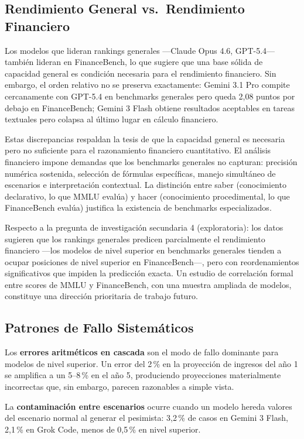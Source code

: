 \documentclass[12pt,a4paper]{article}
\begin{document}
\subsection{Rendimiento General vs.\ Rendimiento Financiero}

Los modelos que lideran rankings generales ---Claude Opus 4.6, GPT-5.4--- también lideran en FinanceBench, lo que sugiere que una base sólida de capacidad general es condición necesaria para el rendimiento financiero. Sin embargo, el orden relativo no se preserva exactamente: Gemini 3.1 Pro compite cercanamente con GPT-5.4 en benchmarks generales pero queda 2,08 puntos por debajo en FinanceBench; Gemini 3 Flash obtiene resultados aceptables en tareas textuales pero colapsa al último lugar en cálculo financiero.

Estas discrepancias respaldan la tesis de que la capacidad general es necesaria pero no suficiente para el razonamiento financiero cuantitativo. El análisis financiero impone demandas que los benchmarks generales no capturan: precisión numérica sostenida, selección de fórmulas específicas, manejo simultáneo de escenarios e interpretación contextual. La distinción entre saber (conocimiento declarativo, lo que MMLU evalúa) y hacer (conocimiento procedimental, lo que FinanceBench evalúa) justifica la existencia de benchmarks especializados.

Respecto a la pregunta de investigación secundaria 4 (exploratoria): los datos sugieren que los rankings generales predicen parcialmente el rendimiento financiero ---los modelos de nivel superior en benchmarks generales tienden a ocupar posiciones de nivel superior en FinanceBench---, pero con reordenamientos significativos que impiden la predicción exacta. Un estudio de correlación formal entre scores de MMLU y FinanceBench, con una muestra ampliada de modelos, constituye una dirección prioritaria de trabajo futuro.

\subsection{Patrones de Fallo Sistemáticos}

Los \textbf{errores aritméticos en cascada} son el modo de fallo dominante para modelos de nivel superior. Un error del 2\,\% en la proyección de ingresos del año 1 se amplifica a un 5--8\,\% en el año 5, produciendo proyecciones materialmente incorrectas que, sin embargo, parecen razonables a simple vista.

La \textbf{contaminación entre escenarios} ocurre cuando un modelo hereda valores del escenario normal al generar el pesimista: 3,2\,\% de casos en Gemini 3 Flash, 2,1\,\% en Grok Code, menos de 0,5\,\% en nivel superior.
\end{document}
